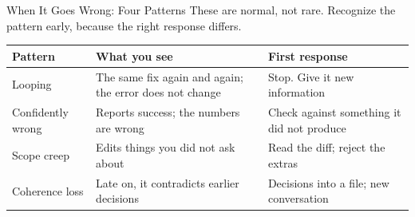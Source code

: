 \documentclass[aspectratio=169, 11pt]{beamer}
\begin{document}
\begin{frame}{When It Goes Wrong: Four Patterns}
  These are normal, not rare. Recognize the pattern early, because the right response differs.

  \vspace{0.4em}
  \small
  \renewcommand{\arraystretch}{1.6}
  \begin{tabular}{@{}L{0.2\textwidth}L{0.38\textwidth}L{0.35\textwidth}@{}}
    \toprule
    \textbf{Pattern} & \textbf{What you see} & \textbf{First response} \\
    \midrule
    Looping & The same fix again and again; the error does not change & Stop. Give it new information \\
    Confidently wrong & Reports success; the numbers are wrong & Check against something it did not produce \\
    Scope creep & Edits things you did not ask about & Read the diff; reject the extras \\
    Coherence loss & Late on, it contradicts earlier decisions & Decisions into a file; new conversation \\
    \bottomrule
  \end{tabular}
\end{frame}
\end{document}
